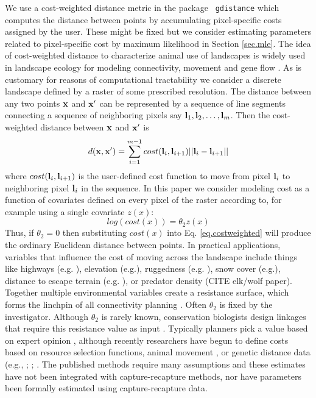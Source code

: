 \documentclass[12pt]{article}
\begin{document}
We use a cost-weighted distance metric in the package \mbox{\tt
gdistance}  which computes the distance
between points by accumulating pixel-specific costs assigned by the
user. These might be fixed but we  consider estimating parameters
related to pixel-specific cost by maximum likelihood in Section \ref{sec.mle}.
The idea of cost-weighted distance to characterize animal use of
landscapes  is widely used in
landscape ecology for modeling connectivity, movement and gene flow
\citep{adriaensen_etal:2003}. As is customary for reasons of
computational tractability we consider a discrete landscape defined by a
raster of some prescribed resolution. The distance between any two points
${\bf x}$ and ${\bf x}'$ can be represented by a sequence of line segments
connecting a sequence of neighboring  pixels say
${\bf l}_{1},{\bf l}_{2},\ldots,{\bf l}_{m}$. Then the cost-weighted distance
between ${\bf x}$ and ${\bf x}'$ is
\begin{equation}
 d({\bf x},{\bf x}')
  =  \sum_{i=1}^{m-1} cost({\bf l}_{i},{\bf l}_{i+1})||{\bf l}_{i} - {\bf l}_{i+1}||
\label{eq.costweighted}
\end{equation}
where $cost({\bf l}_{i},{\bf l}_{i+1})$ is the user-defined cost function
to move
from pixel ${\bf l}_{i}$ to neighboring pixel ${\bf l}_{i}$ in the sequence.
In this paper we consider modeling cost as a function of covariates
defined on every pixel of the raster according to, for example using a
single
covariate $z(x)$:
\begin{equation}
 log(cost(x))=  \theta_{2} z(x)
\label{eq.cost}
\end{equation}
Thus, if $\theta_{2} = 0$ then substituting $cost(x)$ into
Eq. \ref{eq.costweighted} will produce the ordinary Euclidean distance
between points.
In practical applications, variables that
influence the cost of moving across the landscape include things like
highways (e.g. \citet{epps_etal:2005}), elevation
(e.g.\citet{cushman_etal:2006}),
ruggedness (e.g. \citet{epps_etal:2007}), snow cover (e.g.\citet{schwartz_etal:2009}),
distance to escape terrain (e.g. \citet{shirk_etal:2010}), or predator density
(CITE elk/wolf paper).  Together multiple environmental variables create
a resistance surface, which forms the linchpin of all connectivity
planning \citep{spear_etal:2010}.  Often $\theta_{2}$ is fixed by the
investigator. Although
 $\theta_{2}$ is rarely known,
 conservation
biologists design linkages that require this resistance value as input
\citep{beier_etal:2008}.  Typically planners pick a value based on
expert opinion \citep{beier_etal:2007}, although recently researchers
have begun to define costs based on resource selection functions,
animal movement \citep{tracy:2006, dickenson_etal:2005}, or genetic
distance data (e.g., \citet{gerlach_musolf:2000};
\citet{epps_etal:2007}; \citet{schwartz_etal:2009}. The published
methods require many assumptions and these estimates have not been
integrated with capture-recapture methods, nor have parameters been
formally estimated using capture-recapture data.
\end{document}
